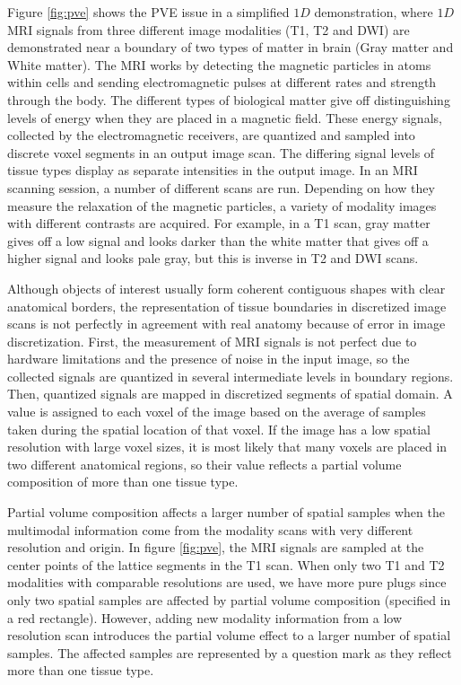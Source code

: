 \noindent Figure \ref{fig:pve} shows the PVE issue in a simplified $1D$ demonstration, where $1D$ MRI signals from three different image modalities (T1, T2 and DWI) are demonstrated near a boundary of two types of matter in brain (Gray matter and White matter).
The MRI works by detecting the magnetic particles in atoms within cells and sending electromagnetic pulses at different rates and strength through the body. The different types of biological matter give off distinguishing levels of energy when they are placed in a magnetic field. These energy signals, collected by the electromagnetic receivers, are quantized and sampled into discrete voxel segments in an output image scan. The differing signal levels of tissue types display as separate intensities in the output image. In an MRI scanning session, a number of different scans are run. Depending on how they measure the relaxation of the magnetic particles, a variety of modality images with different contrasts are acquired. For example, in a T1 scan, gray matter gives off a low signal and looks darker than the white matter that gives off a higher signal and looks pale gray, but this is inverse in T2 and DWI scans.
\newline

\noindent Although objects of interest usually form coherent contiguous shapes with clear anatomical borders, the representation of tissue boundaries in discretized image scans is not perfectly in agreement with real anatomy because of error in image discretization.
First, the measurement of MRI signals is not perfect due to hardware limitations and the presence of noise in the input image, so the collected signals are quantized in several intermediate levels in boundary regions.
Then, quantized signals are mapped in discretized segments of spatial domain. A value is assigned to each voxel of the image based on the average of samples taken during the spatial location of that voxel.
If the image has a low spatial resolution with large voxel sizes, it is most likely that many voxels are placed in two different anatomical regions, so their value reflects a partial volume composition of more than one tissue type.
\newline

\noindent Partial volume composition affects a larger number of spatial samples when the multimodal information come from the modality scans with very different resolution and origin.
In figure \ref{fig:pve}, the MRI signals are sampled at the center points of the lattice segments in the T1 scan. When only two T1 and T2 modalities with comparable resolutions are used, we have more pure plugs since only two spatial samples are affected by partial volume composition (specified in a red rectangle).
However, adding new modality information from a low resolution scan introduces the partial volume effect to a larger number of spatial samples. The affected samples are represented by a question mark as they reflect more than one tissue type.
\newline

